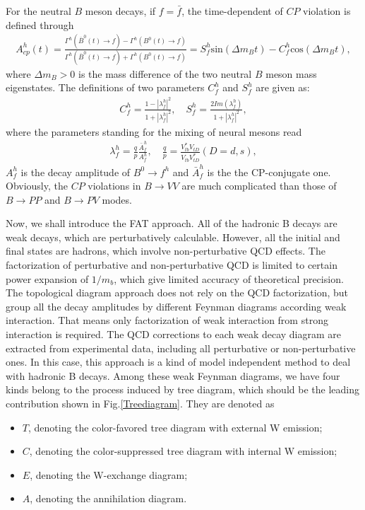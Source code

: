 \documentclass[11pt]{article}
\begin{document}
For the neutral $B$ meson decays, if $f=\bar f$,  the time-dependent of $CP$ violation is defined through
\begin{align}
{A}_{cp}^h(t)=\frac{\Gamma^h(\overline B^0(t)\to f)-\Gamma^h(B^0(t)\to f)}{\Gamma^h(\overline B^0(t)\to f)+\Gamma^h(B^0(t)\to f)}=S_{f}^h\mathrm {sin}(\Delta m_{B} t)-C_{f}^h\mathrm {cos}(\Delta m_{B} t),
\end{align}
where $\Delta m_{B}>0$ is the mass difference of the two neutral $B$ meson mass eigenstates. The definitions of two parameters $C_{f}^h$  and
$S_{f}^h$ are given as:
\begin{align}
C_{f}^h =\frac{1-|\lambda_f^h|^2}{1+|\lambda_f^h|^2}, \,\,\,\,\,\,
S_{f}^h =\frac{2Im(\lambda_f^h)}{1+|\lambda_f^h|^2} ,
\end{align}
where the parameters standing for the mixing of neural mesons read
\begin{align}
\lambda_f^h=\frac{q}{p}\frac{\bar{A}_f^h}{A_f^h}, \,\,\,\,\,\,
\frac{q}{p}=\frac{V^*_{tb}V_{tD}}{V_{tb}V^*_{tD}}(D=d,s) ,
\end{align}
$A_f^h$ is the decay amplitude of $B^{0}\to f^h$ and $\bar{A}_f^h$ is the the CP-conjugate one. Obviously, the $CP$ violations in $B\to VV$ are much complicated than those of $B\to PP$ and $B\to PV$ modes.


Now, we shall introduce the FAT approach. All of the hadronic B decays are weak decays, which are perturbatively calculable. However, all the initial and final states are hadrons, which involve non-perturbative QCD effects. The factorization of perturbative and non-perturbative QCD is limited to certain power expansion of $1/m_b$, which give limited accuracy of theoretical precision. The topological diagram approach does not rely on the QCD factorization, but group all the decay amplitudes by different Feynman diagrams according weak interaction. That means only  factorization of weak interaction from strong interaction is  required.  The QCD corrections to each weak decay diagram are extracted from experimental data, including all perturbative or non-perturbative ones. In this case, this approach is a kind of model independent method to deal with hadronic B decays.  Among these weak Feynman diagrams, we have      four kinds belong to the process induced by tree  diagram, which should be the leading contribution shown in Fig.\ref{Treediagram}.   They are denoted as
\begin{itemize}
  \item $T$, denoting the color-favored tree diagram with external W emission;
  \item $C$, denoting the color-suppressed tree diagram with internal W emission;
  \item $E$, denoting the W-exchange diagram;
  \item $A$, denoting the annihilation diagram.
 \end{itemize}
\end{document}
